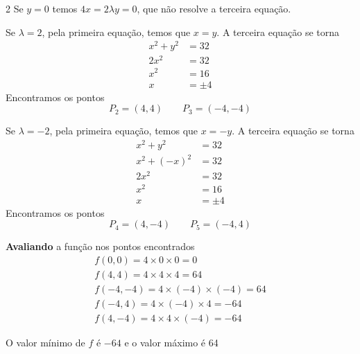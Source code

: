 \documentclass[a4paper,12pt,fleqn]{article}
\begin{document}
\begin{answer}
\begin{multicols*}{2}
  Se $y=0$ temos \(4x = 2\lambda y = 0\), que não resolve a terceira equação.

  Se $\lambda=2$, pela primeira equação, temos que $x=y$.
  A terceira equação se torna
  \begin{align*}
    x^2 + y^2 & = 32    \\
    2x^2      & = 32    \\
    x^2       & = 16    \\
    x         & = \pm 4
  \end{align*}
  Encontramos os pontos
  \[
    P_2 = (4, 4)
    \qquad
    P_3 = (-4, -4)
  \]

  Se $\lambda=-2$, pela primeira equação, temos que $x=-y$.
  A terceira equação se torna
  \begin{align*}
    x^2 + y^2    & = 32    \\
    x^2 + (-x)^2 & = 32    \\
    2x^2         & = 32    \\
    x^2          & = 16    \\
    x            & = \pm 4
  \end{align*}
  Encontramos os pontos
  \[
    P_4 = (4, -4)
    \qquad
    P_5 = (-4, 4)
  \]

  \textbf{Avaliando} a função nos pontos encontrados
  \begin{gather*}
    f( 0,  0) = 4\times   0  \times   0  =   0 \\
    f( 4,  4) = 4\times   4  \times   4  =  64 \\
    f(-4, -4) = 4\times (-4) \times (-4) =  64 \\
    f(-4,  4) = 4\times (-4) \times   4  = -64 \\
    f( 4, -4) = 4\times   4  \times (-4) = -64
  \end{gather*}

  O valor mínimo de $f$ é $-64$ e o valor máximo é 64
\end{multicols*}
\end{answer}

\end{document}
